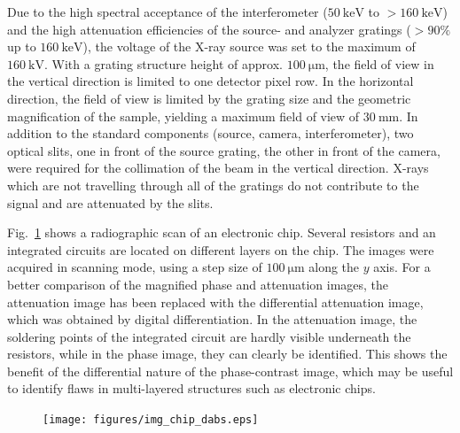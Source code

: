 \documentclass[aip,apl,amsmath,amssymb,floatfix,reprint,a4paper]{revtex4-1}
\begin{document}
Due to the high spectral acceptance \cite{Weitkamp2005,Thuering2013c} of the
interferometer ($\SI{50}{\kilo\electronvolt}$ to
$>\SI{160}{\kilo\electronvolt}$) and the high attenuation efficiencies of
the source- and analyzer gratings ($>90\%$ up to
$\SI{160}{\kilo\electronvolt}$), the voltage of the X-ray source was set to
the maximum of $\SI{160}{\kilo\volt}$. With a grating structure height of
approx. $\SI{100}{\micro \metre}$, the field of view in the vertical
direction is limited to one detector pixel row. In the horizontal direction,
the field of view is limited by the grating size and the geometric
magnification of the sample, yielding a maximum field of view of
$\SI{30}{\milli\metre}$. In addition to the standard components (source,
camera, interferometer), two optical slits, one in front of the source
grating, the other in front of the camera, were required for the collimation
of the beam in the vertical direction. X-rays which are not travelling
through all of the gratings do not contribute to the signal and are
attenuated by the slits.


Fig.~\ref{Fig:img_chip} shows a radiographic scan of an electronic chip.
Several resistors and an integrated circuits are located on different layers
on the chip. The images were acquired in scanning mode, using a step size of
$\SI{100}{\micro \metre}$ along the $y$ axis. For a better comparison of the
magnified phase and attenuation images, the attenuation image has been
replaced with the differential attenuation image, which was obtained by
digital differentiation. In the attenuation image, the soldering points of
the integrated circuit are hardly visible underneath the resistors, while in
the phase image, they can clearly be identified. This shows the
benefit of the differential nature of the phase-contrast image, which may be
useful to identify flaws in multi-layered structures such as electronic
chips.
\begin{figure}[ht]
    \texttt{[image: figures/img\_chip\_dabs.eps]}
    \caption{}
    \label{Fig:img_chip}
\end{figure}
\end{document}
